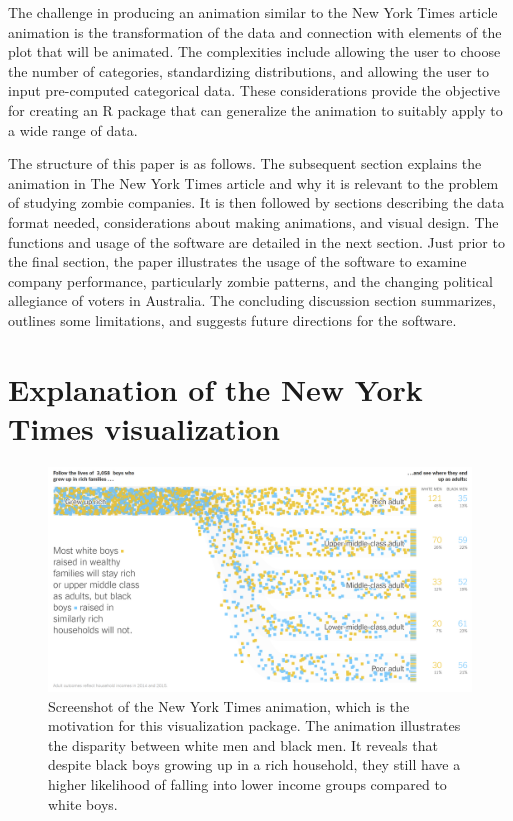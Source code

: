 The challenge in producing an animation similar to the New York Times article animation is the transformation of the data and connection with elements of the plot that will be animated. The complexities include allowing the user to choose the number of categories, standardizing distributions, and allowing the user to input pre-computed categorical data. These considerations provide the objective for creating an R package that can generalize the animation to suitably apply to a wide range of data.

The structure of this paper is as follows. The subsequent section explains the animation in The New York Times article and why it is relevant to the problem of studying zombie companies. It is then followed by sections describing the data format needed, considerations about making animations, and visual design. The functions and usage of the software are detailed in the next section. Just prior to the final section, the paper illustrates the usage of the software to examine company performance, particularly zombie patterns, and the changing political allegiance of voters in Australia. The concluding discussion section summarizes, outlines some limitations, and suggests future directions for the software.

\section{Explanation of the New York Times visualization}\label{NYTvis}

\begin{figure}

{\centering \includegraphics[width=1\linewidth]{figures/NYT} 

}

\caption{Screenshot of the New York Times animation, which is the motivation for this visualization package. The animation illustrates the disparity between white men and black men. It reveals that despite black boys growing up in a rich household, they still have a higher likelihood of falling into lower income groups compared to white boys.}\label{fig:nyt}
\end{figure}

